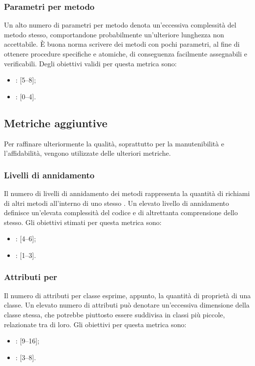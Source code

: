 \subsubsection{Parametri per metodo}
Un alto numero di parametri per metodo denota un'eccessiva complessità del metodo stesso, comportandone probabilmente un'ulteriore lunghezza non accettabile. \`{E} buona norma scrivere dei metodi con pochi parametri, al fine di ottenere procedure specifiche e atomiche, di conseguenza facilmente assegnabili e verificabili.
Degli obiettivi validi per questa metrica sono:
\begin{itemize}
\item {}: [5--8];
\item {}: [0--4].
\end{itemize}

\subsection{Metriche aggiuntive}
Per raffinare ulteriormente la qualità, soprattutto per la manutenibilità e l'affidabilità, vengono utilizzate delle ulteriori metriche.

\subsubsection{Livelli di annidamento}
\label{4.2.2}
Il numero di livelli di annidamento dei metodi rappresenta la quantità di richiami di altri metodi all'interno di uno stesso .
Un elevato livello di annidamento definisce un'elevata complessità del codice e di altrettanta comprensione dello stesso.
Gli obiettivi stimati per questa metrica sono:
\begin{itemize}
\item {}: [4--6];
\item {}: [1--3].
\end{itemize}

\subsubsection{Attributi per }
\label{4.2.3}
Il numero di attributi per classe esprime, appunto, la quantità di proprietà di una classe. Un elevato numero di attributi può denotare un'eccessiva dimensione della classe stessa, che potrebbe piuttosto essere suddivisa in classi più piccole, relazionate tra di loro.
Gli obiettivi per questa metrica sono:
\begin{itemize}
\item {}: [9--16];
\item {}: [3--8].
\end{itemize}

